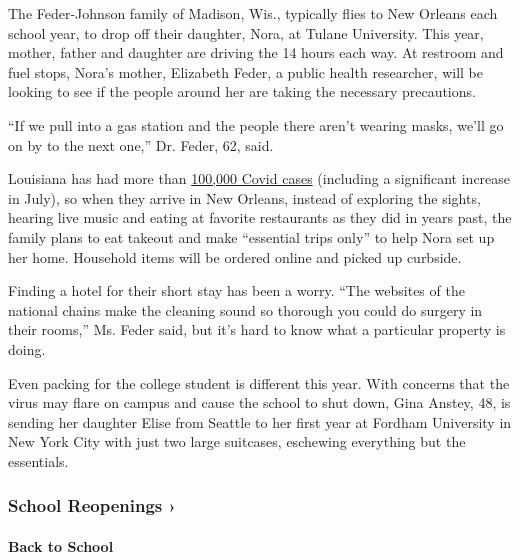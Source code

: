 The Feder-Johnson family of Madison, Wis., typically flies to New
Orleans each school year, to drop off their daughter, Nora, at Tulane
University. This year, mother, father and daughter are driving the 14
hours each way. At restroom and fuel stops, Nora's mother, Elizabeth
Feder, a public health researcher, will be looking to see if the people
around her are taking the necessary precautions.

``If we pull into a gas station and the people there aren't wearing
masks, we'll go on by to the next one,'' Dr. Feder, 62, said.

Louisiana has had more than
\href{https://eur01.safelinks.protection.outlook.com/?url=https\%3A\%2F\%2Fwww.nytimes3xbfgragh.onion\%2Finteractive\%2F2020\%2Fus\%2Flouisiana-coronavirus-cases.html\&data=02\%7C01\%7C\%7Cf98faf91db4c457cd27e08d82cdc651d\%7C84df9e7fe9f640afb435aaaaaaaaaaaa\%7C1\%7C0\%7C637308672381698693\&sdata=VRikgzNv7F\%2B0pyPzti\%2FBaZGxDJK0RPTBOb7Ya7c7ssM\%3D\&reserved=0}{100,000
Covid cases} (including a significant increase in July), so when they
arrive in New Orleans, instead of exploring the sights, hearing live
music and eating at favorite restaurants as they did in years past, the
family plans to eat takeout and make ``essential trips only'' to help
Nora set up her home. Household items will be ordered online and picked
up curbside.

Finding a hotel for their short stay has been a worry. ``The websites of
the national chains make the cleaning sound so thorough you could do
surgery in their rooms,'' Ms. Feder said, but it's hard to know what a
particular property is doing.

Even packing for the college student is different this year. With
concerns that the virus may flare on campus and cause the school to shut
down, Gina Anstey, 48, is sending her daughter Elise from Seattle to her
first year at Fordham University in New York City with just two large
suitcases, eschewing everything but the essentials.

\href{https://www.nytimes3xbfgragh.onion/spotlight/schools-reopening?action=click\&pgtype=Article\&state=default\&region=MAIN_CONTENT_3\&context=storylines_keepup}{}

\hypertarget{school-reopenings-}{%
\subsubsection{School Reopenings ›}\label{school-reopenings-}}

\hypertarget{back-to-school}{%
\paragraph{Back to School}\label{back-to-school}}

